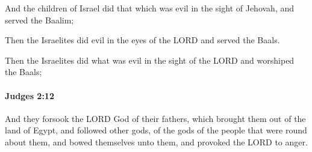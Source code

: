 			\begin{versebox}
					\item[BHS] 
					\item[ASV] And the children of Israel did that which was evil in the sight of Jehovah, and served the Baalim;
					\item[NIV] Then the Israelites did evil in the eyes of the LORD and served the Baals.
					\item[NRSV] Then the Israelites did what was evil in the sight of the LORD and worshiped the Baals;
			\end{versebox}

		\paragraph{Judges 2:12} %
			\label{JUDGES-2-12}

			And they forsook the LORD God of their fathers, which brought them out of the land of Egypt, and followed other gods, of the gods of the people that were round about them, and bowed themselves unto them, and provoked the LORD to anger.

